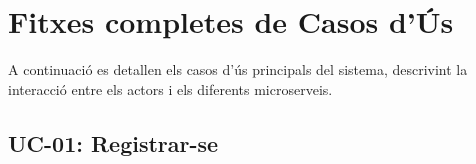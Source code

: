 

\chapter{Fitxes completes de Casos d'Ús}
\label{app:casos_us}

A continuació es detallen els casos d'ús principals del sistema, descrivint la interacció entre els actors i els diferents microserveis.

\section{UC-01: Registrar-se}
